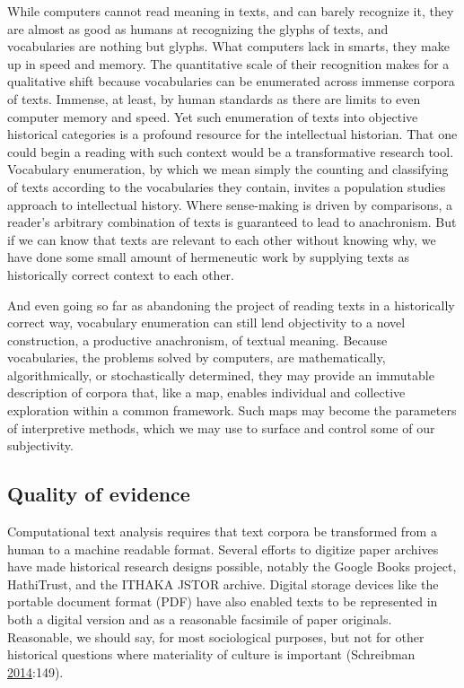 \documentclass[]{book}
\theoremstyle{definition}
\theoremstyle{definition}
\theoremstyle{definition}
\theoremstyle{remark}
\begin{document}
While computers cannot read meaning in texts, and can barely recognize
it, they are almost as good as humans at recognizing the glyphs of
texts, and vocabularies are nothing but glyphs. What computers lack in
smarts, they make up in speed and memory. The quantitative scale of
their recognition makes for a qualitative shift because vocabularies can
be enumerated across immense corpora of texts. Immense, at least, by
human standards as there are limits to even computer memory and speed.
Yet such enumeration of texts into objective historical categories is a
profound resource for the intellectual historian. That one could begin a
reading with such context would be a transformative research tool.
Vocabulary enumeration, by which we mean simply the counting and
classifying of texts according to the vocabularies they contain, invites
a population studies approach to intellectual history. Where
sense-making is driven by comparisons, a reader's arbitrary combination
of texts is guaranteed to lead to anachronism. But if we can know that
texts are relevant to each other without knowing why, we have done some
small amount of hermeneutic work by supplying texts as historically
correct context to each other.

And even going so far as abandoning the project of reading texts in a
historically correct way, vocabulary enumeration can still lend
objectivity to a novel construction, a productive anachronism, of
textual meaning. Because vocabularies, the problems solved by computers,
are mathematically, algorithmically, or stochastically determined, they
may provide an immutable description of corpora that, like a map,
enables individual and collective exploration within a common framework.
Such maps may become the parameters of interpretive methods, which we
may use to surface and control some of our subjectivity.

\hypertarget{quality-of-evidence}{%
\subsection{Quality of evidence}\label{quality-of-evidence}}

Computational text analysis requires that text corpora be transformed
from a human to a machine readable format. Several efforts to digitize
paper archives have made historical research designs possible, notably
the Google Books project, HathiTrust, and the ITHAKA JSTOR archive.
Digital storage devices like the portable document format (PDF) have
also enabled texts to be represented in both a digital version and as a
reasonable facsimile of paper originals. Reasonable, we should say, for
most sociological purposes, but not for other historical questions where
materiality of culture is important (Schreibman
\protect\hyperlink{ref-Schreibman2014NonConsumptive}{2014}:149).
\end{document}
